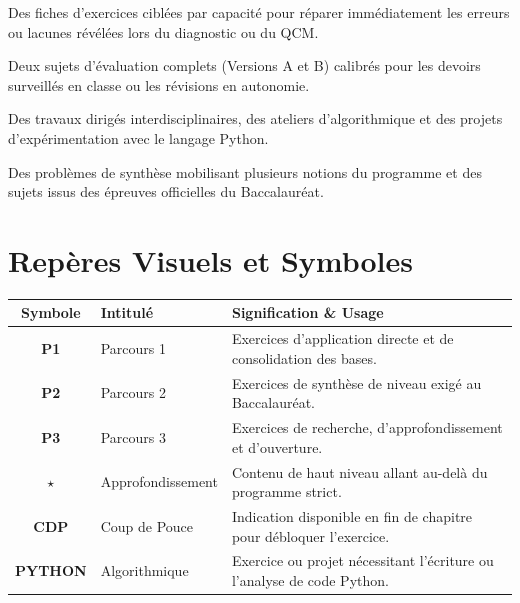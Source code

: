 \begin{description}[font=\sffamily\bfseries\color{chapcolor!90!black}, style=nextline, leftmargin=1.5em]
\item[T8 — Remédiation Ciblée] 
Des fiches d'exercices ciblées par capacité pour réparer immédiatement les erreurs ou lacunes révélées lors du diagnostic ou du QCM.

\item[T9 — Re-Test \& Évaluations] 
Deux sujets d'évaluation complets (Versions A et B) calibrés pour les devoirs surveillés en classe ou les révisions en autonomie.

\item[T10 — Réactivation \& Projets Python] 
Des travaux dirigés interdisciplinaires, des ateliers d'algorithmique et des projets d'expérimentation avec le langage Python.

\item[T11 — Transfert \& Préparation au Baccalauréat] 
Des problèmes de synthèse mobilisant plusieurs notions du programme et des sujets issus des épreuves officielles du Baccalauréat.

\end{description}

\newpage

\section*{Repères Visuels et Symboles}

\begin{center}
\renewcommand{\arraystretch}{1.5}
\sffamily
\begin{tabular}{clp{9cm}}
\toprule
\textbf{Symbole} & \textbf{Intitulé} & \textbf{Signification \& Usage} \\
\midrule
\textbf{P1} & Parcours 1 & Exercices d'application directe et de consolidation des bases. \\
\textbf{P2} & Parcours 2 & Exercices de synthèse de niveau exigé au Baccalauréat. \\
\textbf{P3} & Parcours 3 & Exercices de recherche, d'approfondissement et d'ouverture. \\
$\star$ & Approfondissement & Contenu de haut niveau allant au-delà du programme strict. \\
\textbf{CDP} & Coup de Pouce & Indication disponible en fin de chapitre pour débloquer l'exercice. \\
\textbf{\textsf{PYTHON}} & Algorithmique & Exercice ou projet nécessitant l'écriture ou l'analyse de code Python. \\
\bottomrule
\end{tabular}
\end{center}


